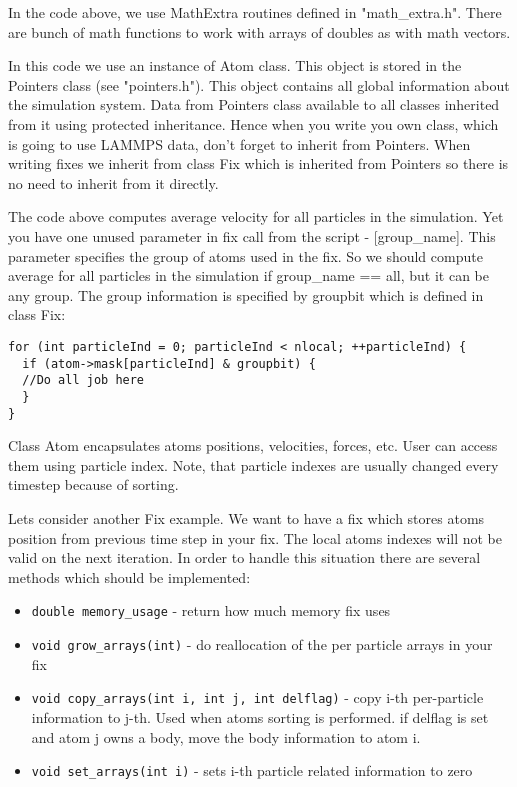 \documentclass{article}
\begin{document}
In the code above, we use MathExtra routines defined in
"math\_extra.h".  There are bunch of math functions to work with
arrays of doubles as with math vectors.

In this code we use an instance of Atom class. This object is stored
in the Pointers class (see "pointers.h"). This object contains all
global information about the simulation system. Data from Pointers
class available to all classes inherited from it using protected
inheritance. Hence when you write you own class, which is going to use
LAMMPS data, don't forget to inherit from Pointers.  When writing
fixes we inherit from class Fix which is inherited from Pointers so
there is no need to inherit from it directly.

The code above computes average velocity for all particles in the
simulation.  Yet you have one unused parameter in fix call from the
script - [group\_name].  This parameter specifies the group of atoms
used in the fix. So we should compute average for all particles in the
simulation if group\_name == all, but it can be any group. The group
information is specified by groupbit which is defined in class Fix:

\begin{center}
\begin{verbatim}
for (int particleInd = 0; particleInd < nlocal; ++particleInd) {
  if (atom->mask[particleInd] & groupbit) {
  //Do all job here
  }
}
\end{verbatim}
\end{center}

Class Atom encapsulates atoms positions, velocities, forces, etc. User
can access them using particle index. Note, that particle indexes are
usually changed every timestep because of sorting.

Lets consider another Fix example. We want to have a fix which stores
atoms position from previous time step in your fix. The local atoms
indexes will not be valid on the next iteration. In order to handle
this situation there are several methods which should be implemented:

\begin{itemize}
\item \verb|double memory_usage| - return how much memory fix uses
\item \verb|void grow_arrays(int)| - do reallocation of the per particle arrays
  in your fix
\item \verb|void copy_arrays(int i, int j, int delflag)| - copy i-th per-particle
  information to j-th. Used when atoms sorting is performed. if delflag is set
  and atom j owns a body, move the body information to atom i.
\item \verb|void set_arrays(int i)| - sets i-th particle related information to zero
\end{itemize}
\end{document}
